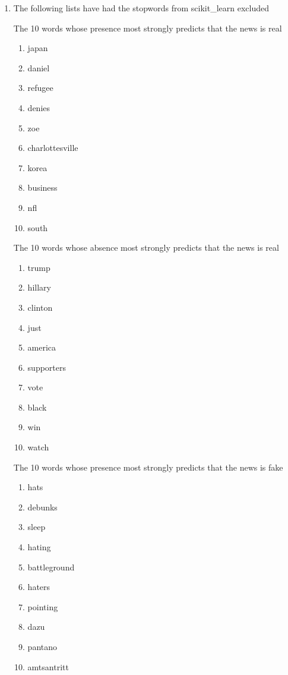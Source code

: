 \documentclass[10pt,letterpaper]{article}
\begin{document}
\begin{enumerate}
\begin{enumerate}
			
			\item %
			The following lists have had the stopwords from scikit\_learn excluded
			
			The 10 words whose presence most strongly predicts that the news is real
			\begin{enumerate}
				\item japan
				\item daniel
				\item refugee
				\item denies
				\item zoe
				\item charlottesville
				\item korea
				\item business
				\item nfl
				\item south
			\end{enumerate}
			
			The 10 words whose absence most strongly predicts that the news is real
			\begin{enumerate}
				\item trump
				\item hillary
				\item clinton
				\item just
				\item america
				\item supporters
				\item vote
				\item black
				\item win
				\item watch
			\end{enumerate}
			
			The 10 words whose presence most strongly predicts that the news is fake
			\begin{enumerate}
				\item hats
				\item debunks
				\item sleep
				\item hating
				\item battleground
				\item haters
				\item pointing
				\item dazu
				\item pantano
				\item amtsantritt
			\end{enumerate}
			

\end{enumerate}
\end{enumerate}
\end{document}
